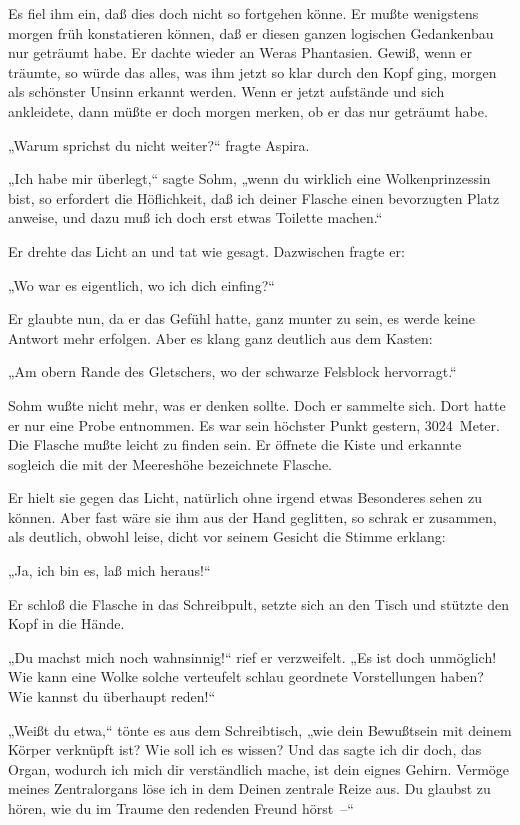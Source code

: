 Es fiel ihm ein, daß dies doch nicht so fortgehen könne. Er mußte
wenigstens morgen früh konstatieren können, daß er diesen ganzen
logischen Gedankenbau nur geträumt habe. Er dachte wieder an Weras
Phantasien. Gewiß, wenn er träumte, so würde das alles, was ihm
jetzt so klar durch den Kopf ging, morgen als schönster Unsinn
erkannt werden. Wenn er jetzt aufstände und sich ankleidete, dann
müßte er doch morgen merken, ob er das nur geträumt habe.

„Warum sprichst du nicht weiter?“ fragte Aspira.

„Ich habe mir überlegt,“ sagte Sohm, „wenn du wirklich eine
Wolkenprinzessin bist, so erfordert die Höflichkeit, daß ich deiner
Flasche einen bevorzugten Platz anweise, und dazu muß ich doch erst
etwas Toilette machen.“

Er drehte das Licht an und tat wie gesagt. Dazwischen fragte er:

„Wo war es eigentlich, wo ich dich einfing?“

Er glaubte nun, da er das Gefühl hatte, ganz munter zu sein, es
werde keine Antwort mehr erfolgen. Aber es klang ganz deutlich aus
dem Kasten:

„Am obern Rande des Gletschers, wo der schwarze Felsblock
hervorragt.“

Sohm wußte nicht mehr, was er denken sollte. Doch er sammelte sich.
Dort hatte er nur eine Probe entnommen. Es war sein höchster Punkt
gestern, 3024~Meter. Die Flasche mußte leicht zu finden sein. Er
öffnete die Kiste und erkannte sogleich die mit der Meereshöhe
bezeichnete Flasche.

Er hielt sie gegen das Licht, natürlich ohne irgend etwas
Besonderes sehen zu können. Aber fast wäre sie ihm aus der Hand
geglitten, so schrak er zusammen, als deutlich, obwohl leise, dicht
vor seinem Gesicht die Stimme erklang:

„Ja, ich bin es, laß mich heraus!“

Er schloß die Flasche in das Schreibpult, setzte sich an den Tisch
und stützte den Kopf in die Hände.

„Du machst mich noch wahnsinnig!“ rief er verzweifelt. „Es ist doch
unmöglich! Wie kann eine Wolke solche verteufelt schlau geordnete
Vorstellungen haben? Wie kannst du überhaupt reden!“

„Weißt du etwa,“ tönte es aus dem Schreibtisch, „wie dein
Bewußtsein mit deinem Körper verknüpft ist? Wie soll ich es wissen?
Und das sagte ich dir doch, das Organ, wodurch ich mich dir
verständlich mache, ist dein eignes Gehirn. Vermöge meines
Zentralorgans löse ich in dem Deinen zentrale Reize aus. Du glaubst
zu hören, wie du im Traume den redenden Freund hörst~–“


